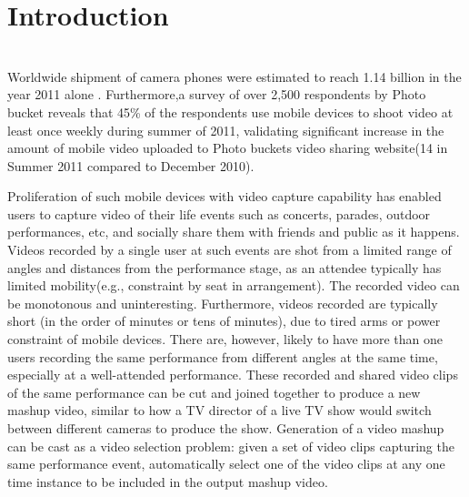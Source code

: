 \documentclass{sig-alternate}
\providecommand{\DIFadd}[1]{{\protect\color{blue}\uwave{#1}}} %
\providecommand{\DIFaddbegin}{} %
\providecommand{\DIFaddend}{} %
\newcommand{\DIFaddincludegraphics}[2][]{{\color{blue}\fbox{\DIFOincludegraphics[#1]{#2}}}} %
\DeclareRobustCommand{\DIFaddbegin}{\DIFOaddbegin \let\includegraphics\DIFaddincludegraphics} %
\DeclareRobustCommand{\DIFaddend}{\DIFOaddend \let\includegraphics\DIFOincludegraphics} %
\begin{document}



\section{Introduction}
\DIFaddbegin \DIFadd{I have created some changes in this.}\\

\DIFaddend Worldwide shipment of camera phones were estimated to reach 1.14 billion in the year 2011 alone \cite{arnolʹd2012geometrical}.
Furthermore,a survey of over 2,500 respondents by Photo bucket reveals that 45\% of the respondents use mobile devices to shoot video at least once weekly during summer of 2011, validating significant increase in the amount of mobile video uploaded to Photo buckets video sharing website(14 in Summer 2011 compared to December 2010)\cite{arnolʹd2012geometrical}.

 Proliferation of such mobile devices with video capture capability has enabled users to capture video of their life events such as concerts, parades, outdoor performances, etc, and socially share them with friends and public as it happens. Videos recorded by a single user at such events are shot from a limited range of angles and distances from the performance stage, as an attendee typically has limited mobility(e.g., constraint by seat in arrangement). The recorded video can be monotonous and uninteresting. Furthermore, videos recorded are typically short (in the order of minutes or tens of minutes), due to tired arms or power constraint of mobile devices. There are, however, likely to have more than one users recording the same performance from different angles at the same time, especially at a well-attended performance. These recorded and shared video clips of the same performance can be cut and joined together to produce a new mashup video, similar to how a TV director of a live TV show would switch between different cameras to produce the show. Generation of a video mashup can be cast as a video selection problem: given a set of video clips capturing the same performance event, automatically select one of the video clips at any one time instance to be included in the output mashup video.
\end{document}
